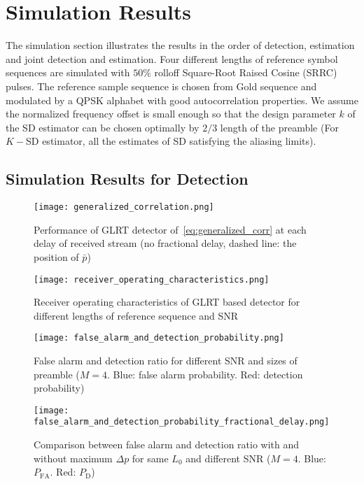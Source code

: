 \section{Simulation Results}%
\label{sec:simulations}

The simulation section illustrates the results in the order of detection, estimation and joint detection and estimation.
Four different lengths of reference symbol sequences are simulated with $50\%$ rolloff Square-Root Raised Cosine (SRRC) pulses.
The reference sample sequence is chosen from Gold sequence and modulated by a QPSK alphabet with good autocorrelation properties.
We assume the normalized frequency offset is small enough so that the design parameter $k$ of the SD estimator
can be chosen optimally by $2/3$ length of the preamble (For $K-$SD estimator, all the estimates of SD satisfying the aliasing limits). 

\subsection{Simulation Results for Detection}

\begin{figure}[t]
    \centerline{\texttt{[image: generalized\_correlation.png]}}
    \caption{Performance of GLRT detector of~\eqref{eq:generalized_corr} at each delay of received stream (no fractional delay, dashed line: the position of $\bar{p}$)}
    \label{fig:Generalized correlation}
    \end{figure}

\begin{figure}[t]
    \centerline{\texttt{[image: receiver\_operating\_characteristics.png]}}
    \caption{Receiver operating characteristics of GLRT based detector for different lengths of reference sequence and SNR}
    \label{fig:Receiver operating characteristics}
    \end{figure}

\begin{figure}[t]
    \centerline{\texttt{[image: false\_alarm\_and\_detection\_probability.png]}}
    \caption{False alarm and detection ratio for different SNR and sizes of preamble ($M=4$. Blue: false alarm probability. Red: detection probability)}
    \label{fig:False alarm and detection}
    \end{figure}

\begin{figure}[t]
    \centerline{\texttt{[image: false\_alarm\_and\_detection\_probability\_fractional\_delay.png]}}
    \caption{Comparison between false alarm and detection ratio with and without maximum $\Delta p$ for same $L_0$ and different SNR ($M=4$. Blue: $P_{\text{FA}}$. Red: $P_{\text{D}}$)}
    \label{fig:False alarm and detection with frac delay}
    \end{figure}

